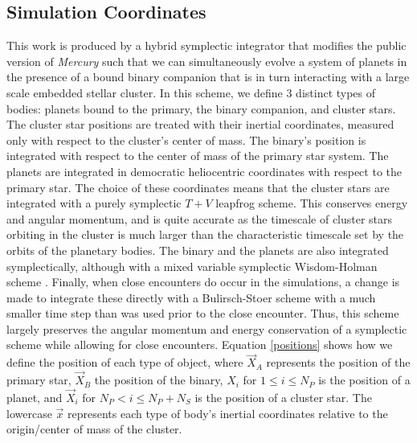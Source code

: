 \documentclass{aastex631}
\begin{document}
\subsection{Simulation Coordinates}
This work is produced by a hybrid symplectic integrator that modifies the public version of \textit{Mercury} such that we can simultaneously evolve a system of planets
in the presence of a bound binary companion that is in turn interacting with a large scale embedded stellar cluster.
In this scheme, we define 3 distinct types of bodies: planets 
bound to the primary, the binary companion, and cluster stars. The cluster star positions are treated with their inertial coordinates,
measured only with respect to the cluster's center of mass. The binary's position
is integrated with respect to the center of mass of the primary star system. 
The planets are integrated in democratic heliocentric coordinates with respect to the primary star.
The choice of these coordinates means that the cluster stars are integrated with a purely symplectic $T+V$ leapfrog scheme. This
conserves energy and angular momentum, and is quite accurate as the timescale of cluster stars orbiting in the cluster
is much larger than the characteristic timescale set by the orbits of the planetary bodies. The binary and the planets 
are also integrated symplectically, although with a mixed variable symplectic Wisdom-Holman scheme \citep{wis91}. Finally, when close encounters do occur in the simulations,
a change is made to integrate these directly with a Bulirsch-Stoer scheme with a much smaller time step than was used prior to the close
encounter. Thus, this scheme largely preserves the angular momentum and energy conservation of a symplectic scheme while allowing
for close encounters.
Equation \ref{positions} shows how we define the position of each type of object, where $\vec{X}_A$ represents the position of the primary star,
$\vec{X}_B$ the position of the binary, $X_{i}$ for $1\leq i \leq N_P$ is the position of a planet, and $\vec{X}_i$ for $N_P < i \leq N_P+N_S$ is the position of a cluster star.
The lowercase $\vec{x}$ represents each type of body's inertial coordinates relative to the origin/center of mass of the cluster.
\end{document}
